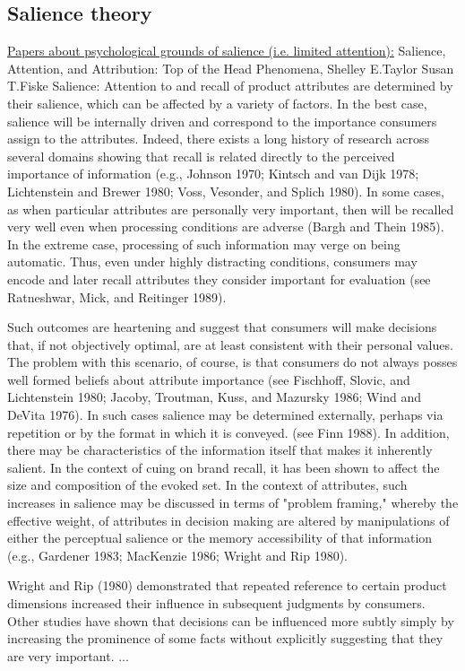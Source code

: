 \subsection*{Salience theory}

\underline{Papers about psychological grounds of salience (i.e. limited attention):}
Salience, Attention, and Attribution: Top of the Head Phenomena, Shelley E.Taylor Susan T.Fiske
Salience: Attention to and recall of product attributes are determined by their salience, which can be affected by a variety of factors. In the best case, salience will be internally driven and correspond to the importance consumers assign to the attributes. Indeed, there exists a long history of research across several domains showing that recall is related directly to the perceived importance of information (e.g., Johnson 1970; Kintsch and van Dijk 1978; Lichtenstein and Brewer 1980; Voss, Vesonder, and Splich 1980). In some cases, as when particular attributes are personally very important, then will be recalled very well even when processing conditions are adverse (Bargh and Thein 1985). In the extreme case, processing of such information may verge on being automatic. Thus, even under highly distracting conditions, consumers may encode and later recall attributes they consider important for evaluation (see Ratneshwar, Mick, and Reitinger 1989).

Such outcomes are heartening and suggest that consumers will make decisions that, if not objectively optimal, are at least consistent with their personal values. The problem with this scenario, of course, is that consumers do not always posses well formed beliefs about attribute importance (see Fischhoff, Slovic, and Lichtenstein 1980; Jacoby, Troutman, Kuss, and Mazursky 1986; Wind and DeVita 1976). In such cases salience may be determined externally, perhaps via repetition or by the format in which it is conveyed. (see Finn 1988). In addition, there may be characteristics of the information itself that makes it inherently salient. In the context of cuing on brand recall, it has been shown to affect the size and composition of the evoked set. In the context of attributes, such increases in salience may be discussed in terms of "problem framing," whereby the effective weight, of attributes in decision making are altered by manipulations of either the perceptual salience or the memory accessibility of that information (e.g., Gardener 1983; MacKenzie 1986; Wright and Rip 1980).

Wright and Rip (1980) demonstrated that repeated reference to certain product dimensions increased their influence in subsequent judgments by consumers. Other studies have shown that decisions can be influenced more subtly simply by increasing the prominence of some facts without explicitly suggesting that they are very important. 
...

